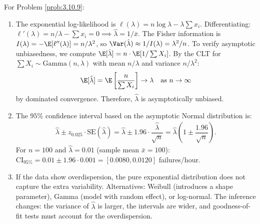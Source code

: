 \begin{solucion}
	\label{sol:3.10.9}
	For Problem \ref{prob:3.10.9}:
	\begin{enumerate}
		\item The exponential log-likelihood is $\ell(\lambda) = n\log \lambda - \lambda \sum x_{i}$. Differentiating: $\ell'(\lambda) = n/\lambda - \sum x_{i} = 0 \implies \hat{\lambda} = 1/\bar{x}$. The Fisher information is $I(\lambda) = -\E[\ell''(\lambda)] = n/\lambda^{2}$, so $\Var(\hat{\lambda}) \approx 1/I(\lambda) = \lambda^{2}/n$. To verify asymptotic unbiasedness, we compute $\E[\hat{\lambda}] = n \cdot \E[1/\sum X_{i}]$. By the CLT for $\sum X_{i} \sim \text{Gamma}(n, \lambda)$ with mean $n/\lambda$ and variance $n/\lambda^{2}$:
		\begin{align*}
			\E[\hat{\lambda}] = \E\left[\dfrac{n}{\sum X_{i}}\right] \to \lambda \quad \text{as } n \to \infty
		\end{align*}
		by dominated convergence. Therefore, $\hat{\lambda}$ is asymptotically unbiased.
		\item The $95\%$ confidence interval based on the asymptotic Normal distribution is:
		\begin{align*}
			\hat{\lambda} \pm z_{0.025} \cdot \text{SE}(\hat{\lambda}) = \hat{\lambda} \pm 1.96 \cdot \dfrac{\hat{\lambda}}{\sqrt{n}} = \hat{\lambda}\left(1 \pm \dfrac{1.96}{\sqrt{n}}\right).
		\end{align*}
		For $n = 100$ and $\hat{\lambda} = 0.01$ (sample mean $\bar{x} = 100$): $\text{CI}_{95\%} = 0.01 \pm 1.96 \cdot 0.001 = [0.0080, 0.0120]$ failures/hour.
		\item If the data show overdispersion, the pure exponential distribution does not capture the extra variability. Alternatives: Weibull (introduces a shape parameter), Gamma (model with random effect), or log-normal. The inference changes: the variance of $\hat{\lambda}$ is larger, the intervals are wider, and goodness-of-fit tests must account for the overdispersion.
	\end{enumerate}
\end{solucion}

